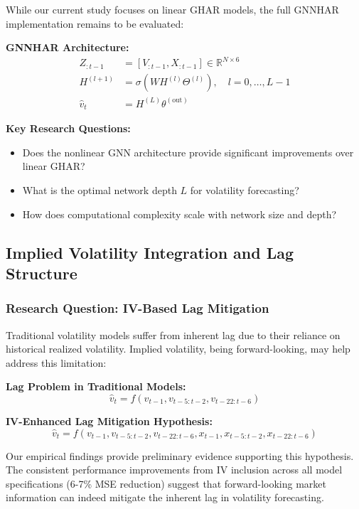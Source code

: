 \documentclass[12pt,a4paper]{article}
\begin{document}
While our current study focuses on linear GHAR models, the full GNNHAR implementation remains to be evaluated:

\textbf{GNNHAR Architecture:}
\begin{align}
Z_{:t-1} &= [V_{:t-1}, X_{:t-1}] \in \mathbb{R}^{N\times 6} \\
H^{(l+1)} &= \sigma(WH^{(l)}\Theta^{(l)}), \quad l = 0,\ldots,L-1 \\
\hat{v}_t &= H^{(L)}\theta^{(\text{out})}
\end{align}

\textbf{Key Research Questions:}
\begin{itemize}
\item Does the nonlinear GNN architecture provide significant improvements over linear GHAR?
\item What is the optimal network depth $L$ for volatility forecasting?
\item How does computational complexity scale with network size and depth?
\end{itemize}

\subsection{Implied Volatility Integration and Lag Structure}

\subsubsection{Research Question: IV-Based Lag Mitigation}

Traditional volatility models suffer from inherent lag due to their reliance on historical realized volatility. Implied volatility, being forward-looking, may help address this limitation:

\textbf{Lag Problem in Traditional Models:}
$$\hat{v}_t = f(v_{t-1}, v_{t-5:t-2}, v_{t-22:t-6})$$

\textbf{IV-Enhanced Lag Mitigation Hypothesis:}
$$\hat{v}_t = f(v_{t-1}, v_{t-5:t-2}, v_{t-22:t-6}, x_{t-1}, x_{t-5:t-2}, x_{t-22:t-6})$$

Our empirical findings provide preliminary evidence supporting this hypothesis. The consistent performance improvements from IV inclusion across all model specifications (6-7\% MSE reduction) suggest that forward-looking market information can indeed mitigate the inherent lag in volatility forecasting.
\end{document}
